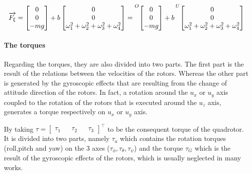 \documentclass{thesisreport}
\begin{document}
\begin{equation}
\overrightarrow{F_{\xi}}  = \begin{bmatrix}
0 \\
0 \\
-mg \\
\end{bmatrix} 
+ 
b \begin{bmatrix}
0 \\ 
0 \\
\omega_1^2 + \omega_2^2 + \omega_3^2 + \omega_4^2\\
\end{bmatrix}=
\prescript{O}{}{\begin{bmatrix}
0 \\
0 \\
-mg \\
\end{bmatrix}}
+ b \prescript{U}{}{\begin{bmatrix}
0 \\ 
0 \\
\omega_1^2 + \omega_2^2 + \omega_3^2 + \omega_4^2\\
\end{bmatrix}}
\end{equation}








\newpage

\paragraph{The torques}
Regarding the torques, they are also divided into two parts. The first part is the result of the relations between the velocities of the rotors. Whereas the other part is generated by the gyroscopic effects that are resulting from the change of attitude direction of the rotors. In fact, a rotation around the $u_x$ or $u_y$ axis coupled to the rotation of the rotors that is executed around the $u_z$ axis, generates a torque respectively on $u_x$ or $u_y$ axis.

By taking $\tau=\begin{bmatrix}
\tau_1 && \tau_2 && \tau_3 
\end{bmatrix}^{\intercal}$ to be the consequent torque of the quadrotor. It is divided into two parts, namely $\tau_a$ which contains the rotation torques (roll,pitch and yaw) on the 3 axes ($\tau_{\phi}, \tau_{\theta}, \tau_{\psi}$) and the torque $\tau_G$ which is the result of the gyroscopic effects of the rotors, which is usually neglected in many works.
\end{document}
